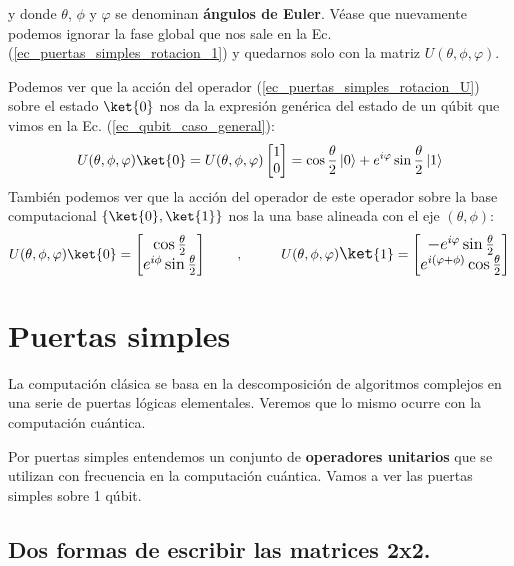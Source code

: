 \documentclass[a4paper,11pt]{book} %
\numberwithin{equation}{chapter}
\def\lch{\left\{}
\def\rch{\right\}}
\begin{document}
y donde $\theta$, $\phi$ y $\varphi$ se denominan \textbf{ángulos de Euler}. Véase que nuevamente podemos ignorar la fase global que nos sale en la Ec. (\ref{ec_puertas_simples_rotacion_1}) y quedarnos solo con la matriz $U (\theta, \phi, \varphi)$.

Podemos ver que la acción del operador (\ref{ec_puertas_simples_rotacion_U}) sobre el estado $\ket{0}$ nos da la expresión genérica del estado de un qúbit que vimos en la Ec. (\ref{ec_qubit_caso_general}):
	\begin{equation}
	U (\theta, \phi, \varphi) \ket{0} = 
	U (\theta, \phi, \varphi) \begin{bmatrix} 1 \\ 0 \end{bmatrix} = 
	 \cos{\frac{\theta}{2}}\, |0\rangle + e^{i\varphi}\sin{\frac{\theta}{2}}\,|1\rangle
	\end{equation}
También podemos ver que la acción del operador de este operador sobre la base computacional $\lch \ket{0}, \ket{1} \rch$ nos la una base alineada con el eje $(\theta, \phi)$:
	\begin{equation}
	U(\theta,\phi,\varphi) \ket{0} = 
		\large{\begin{bmatrix} \cos \frac{\theta}{2}  \\ e^{i\phi} \sin \frac{\theta}{2} \end{bmatrix} }
	~~~~~~,~~~~~~~
	U(\theta,\phi,\varphi) \ket{1} = 
		\large{\begin{bmatrix} -e^{i\varphi}\sin \frac{\theta}{2} \\ e^{i(\varphi + \phi)} \cos \frac{\theta}{2} \end{bmatrix} }
	\end{equation}

    \section{Puertas simples}

La computación clásica se basa en la descomposición de algoritmos complejos en una serie de puertas lógicas elementales. Veremos que lo mismo ocurre con la computación cuántica.  

Por puertas simples entendemos un conjunto de \textbf{operadores unitarios} que se utilizan con frecuencia en la computación cuántica. Vamos a ver las puertas simples sobre 1 qúbit. 

		\subsection{Dos formas de escribir las matrices 2x2.}   
\end{document}
